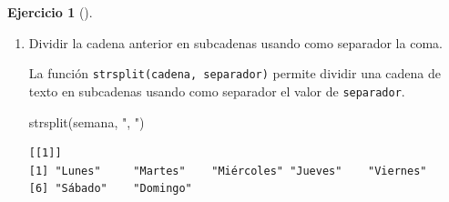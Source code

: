 \documentclass[
  a4paper,
]{scrreport}
\newenvironment{Shaded}{\begin{snugshade}}{\end{snugshade}}
\newcommand{\AttributeTok}[1]{\textcolor[rgb]{0.40,0.45,0.13}{#1}}
\newcommand{\FunctionTok}[1]{\textcolor[rgb]{0.28,0.35,0.67}{#1}}
\newcommand{\NormalTok}[1]{\textcolor[rgb]{0.00,0.23,0.31}{#1}}
\newcommand{\OtherTok}[1]{\textcolor[rgb]{0.00,0.23,0.31}{#1}}
\newcommand{\StringTok}[1]{\textcolor[rgb]{0.13,0.47,0.30}{#1}}
\theoremstyle{definition}
\newtheorem{exercise}{Ejercicio}[chapter]
\theoremstyle{remark}
\begin{document}
\begin{exercise}[]
\begin{enumerate}
\begin{tcolorbox}
\begin{Shaded}
\begin{Highlighting}[]
\NormalTok{semana }\OtherTok{\textless{}{-}} \FunctionTok{paste}\NormalTok{(dias, }\AttributeTok{collapse =} \StringTok{", "}\NormalTok{)}
\NormalTok{semana}
\end{Highlighting}
\end{Shaded}

\begin{verbatim}
[1] "Lunes, Martes, Miércoles, Jueves, Viernes, Sábado, Domingo"
\end{verbatim}

  \end{tcolorbox}
\item
  Dividir la cadena anterior en subcadenas usando como separador la
  coma.

  \begin{tcolorbox}[enhanced jigsaw, colframe=quarto-callout-tip-color-frame, toprule=.15mm, bottomtitle=1mm, breakable, opacitybacktitle=0.6, toptitle=1mm, colback=white, bottomrule=.15mm, title=\textcolor{quarto-callout-tip-color}{\faLightbulb}\hspace{0.5em}{Solución}, arc=.35mm, left=2mm, titlerule=0mm, rightrule=.15mm, coltitle=black, leftrule=.75mm, opacityback=0, colbacktitle=quarto-callout-tip-color!10!white]

  La función \texttt{strsplit(cadena,\ separador)} permite dividir una
  cadena de texto en subcadenas usando como separador el valor de
  \texttt{separador}.

\begin{Shaded}
\begin{Highlighting}[]
\FunctionTok{strsplit}\NormalTok{(semana, }\StringTok{", "}\NormalTok{)}
\end{Highlighting}
\end{Shaded}

\begin{verbatim}
[[1]]
[1] "Lunes"     "Martes"    "Miércoles" "Jueves"    "Viernes"  
[6] "Sábado"    "Domingo"  
\end{verbatim}

  \end{tcolorbox}
\end{enumerate}

\end{exercise}
\end{document}
